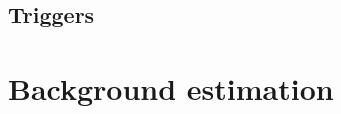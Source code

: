 

\subsection{Triggers}
\label{sec:svj_triggers}



\section{Background estimation}
\label{sec:svj_background_est}
